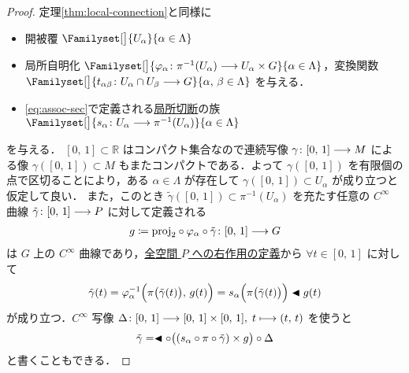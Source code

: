 \documentclass[TQFT_main]{subfiles}
\begin{document}
\begin{proof}
    定理\ref{thm:local-connection}と同様に
    \begin{itemize}
        \item 開被覆 $\Familyset[\big]{U_\alpha}{\alpha \in \Lambda}$
        \item 局所自明化 $\Familyset[\big]{\varphi_\alpha \colon \pi^{-1}(U_\alpha) \lto U_\alpha \times G}{\alpha \in \Lambda}$，変換関数 $\Familyset[\big]{t_{\alpha\beta} \colon U_\alpha \cap U_\beta \lto G}{\alpha,\, \beta \in \Lambda}$ を与える．
        \item \eqref{eq:assoc-sec}で定義される\hyperref[def.section]{局所切断}の族 $\Familyset[\big]{s_\alpha \colon U_\alpha \lto \pi^{-1}(U_\alpha)}{\alpha \in \Lambda}$
    \end{itemize}
    を与える．
    $[0,\, 1] \subset \mathbb{R}$ はコンパクト集合なので連続写像 $\gamma \colon [0,\, 1] \longrightarrow M$ による像 $\gamma ([0,\, 1]) \subset M$ もまたコンパクトである．よって $\gamma([0,\, 1])$ を有限個の点で区切ることにより，ある $\alpha \in \Lambda$ が存在して $\gamma([0,\, 1]) \subset U_\alpha$ が成り立つと仮定して良い．
    また，このとき $\tilde{\gamma} ([0,\, 1]) \subset \pi^{-1}(U_\alpha)$ を充たす任意の $C^\infty$ 曲線 $\tilde{\gamma} \colon [0,\, 1] \longrightarrow P$ に対して定義される
    \begin{align}
        g \coloneqq \mathrm{proj}_2 \circ \varphi_\alpha \circ \tilde{\gamma} \colon [0,\, 1] \longrightarrow G
    \end{align}
    は $G$ 上の $C^\infty$ 曲線であり，\hyperref[prop.PFD_right]{全空間 $P$ への右作用の定義}から $\forall t \in [0,\, 1]$ に対して
    \begin{align}
        \tilde{\gamma}(t) = \varphi_\alpha^{-1} \Bigl( \pi\bigl(\tilde{\gamma}(t)\bigr),\, g(t) \Bigr) = s_\alpha \Bigl( \pi \bigl( \tilde{\gamma}(t) \bigr) \Bigr) \blacktriangleleft g(t)
    \end{align}
    が成り立つ．$C^\infty$ 写像 $\Delta \colon [0,\, 1] \longrightarrow [0,\, 1] \times [0,\, 1],\; t \longmapsto (t,\, t)$ を使うと
    \begin{align}
        \label{eq:horizontal-lift-curve-1}
        \tilde{\gamma} = \blacktriangleleft \circ \bigl( (s_\alpha \circ \pi \circ \tilde{\gamma}) \times g \bigr) \circ \Delta
    \end{align}
    と書くこともできる．


\end{proof}
\end{document}
